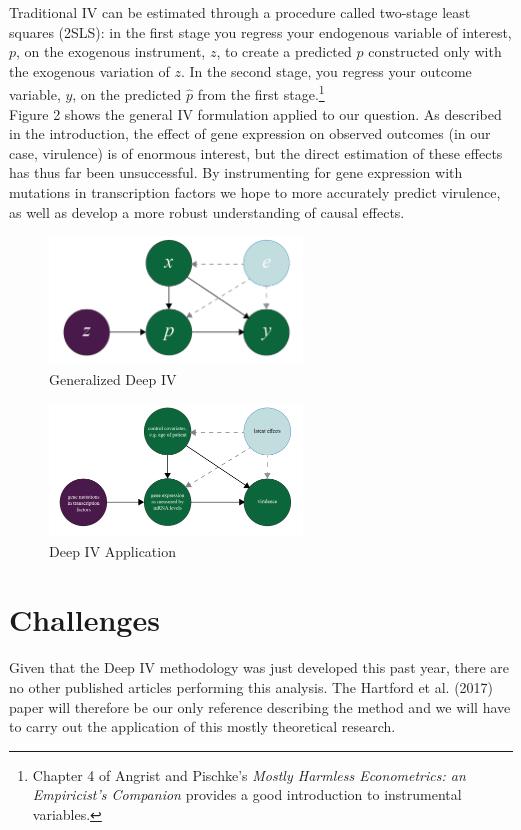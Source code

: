 \documentclass[11pt, oneside]{article}   	%
\begin{document}
Traditional IV can be estimated through a procedure called two-stage least squares (2SLS): in the first stage you regress your endogenous variable of interest, $p$,  on the exogenous instrument, $z$, to create a predicted $\hat{p}$ constructed only with the exogenous variation of $z$. In the second stage, you regress your outcome variable, $y$, on the predicted $\hat{p}$ from the first stage.\footnote{Chapter 4 of Angrist and Pischke's \emph{Mostly Harmless Econometrics: an Empiricist's Companion} provides a good introduction to instrumental variables.}
 \\
 
 
Figure 2 shows the general IV formulation applied to our question. As described in the introduction, the effect of gene expression on observed outcomes (in our case, virulence) is of enormous interest, but the direct estimation of these effects has thus far been unsuccessful. By instrumenting for gene expression with mutations in transcription factors we hope to more accurately predict virulence, as well as develop a more robust understanding of causal effects.\\

\begin{figure}[h]
\caption{Generalized Deep IV}
\centering
\includegraphics[width=0.6\textwidth]{figure_1.png}
\end{figure}


\begin{figure}[h]
\caption{Deep IV Application}
\centering
\includegraphics[width=0.6\textwidth]{figure_2.png}
\end{figure} 

\section{Challenges}
Given that the Deep IV methodology was just developed this past year, there are no other published articles performing this analysis. The Hartford et al. (2017) paper will therefore be our only reference describing the method and we will have to carry out the application of this mostly theoretical research. 
\end{document}
